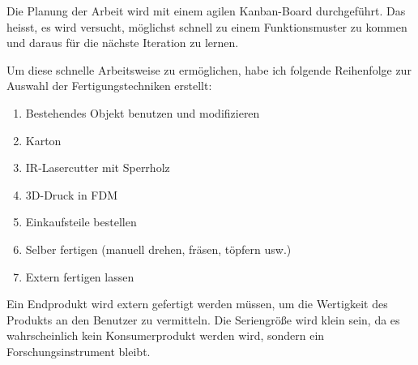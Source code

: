 

Die Planung der Arbeit wird mit einem agilen Kanban-Board durchgeführt. Das heisst, es wird versucht, möglichst schnell zu einem Funktionsmuster zu kommen und daraus für die nächste Iteration zu lernen.

Um diese schnelle Arbeitsweise zu ermöglichen, habe ich folgende Reihenfolge zur Auswahl der Fertigungstechniken erstellt:

\begin{enumerate}
\item Bestehendes Objekt benutzen und modifizieren
\item Karton
\item IR-Lasercutter mit Sperrholz
\item 3D-Druck in FDM
\item Einkaufsteile bestellen
\item Selber fertigen (manuell drehen, fräsen, töpfern usw.)
\item Extern fertigen lassen
\end{enumerate}

Ein Endprodukt wird extern gefertigt werden müssen, um die Wertigkeit des Produkts an den Benutzer zu vermitteln. Die Seriengröße wird klein sein, da es wahrscheinlich kein Konsumerprodukt werden wird, sondern ein Forschungsinstrument bleibt.
